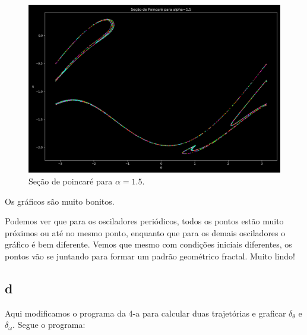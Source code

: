 \documentclass[12pt,a4paper]{article}
\begin{document}
\begin{figure}[H]
\centering
\includegraphics[width=\textwidth]{../tarefa-4c/secao_poincare_alpha_1.5.png}
\caption{Seção de poincaré para $\alpha = 1.5$.}
\end{figure}

Os gráficos são muito bonitos.

Podemos ver que para os osciladores periódicos, todos os pontos estão muito próximos ou até no mesmo ponto, enquanto que para os demais osciladores o gráfico é bem diferente. Vemos que mesmo com condições iniciais diferentes, os pontos vão se juntando para formar um padrão geométrico fractal. Muito lindo!

\subsection{d}

Aqui modificamos o programa da 4-a para calcular duas trajetórias e graficar $\delta_{\theta}$ e $\delta_{\omega}$. Segue o programa:
\end{document}
